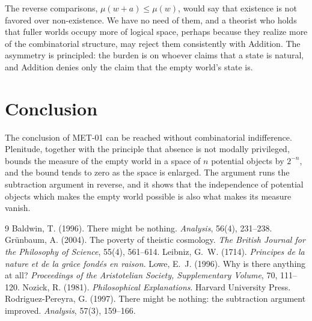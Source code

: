 \documentclass{situationist-preprint}
\begin{document}
\begin{reply}
The reverse comparisons, $\mu(w + a) \leq \mu(w)$, would say that existence is not favored over non-existence. We have no need of them, and a theorist who holds that fuller worlds occupy more of logical space, perhaps because they realize more of the combinatorial structure, may reject them consistently with Addition. The asymmetry is principled: the burden is on whoever claims that a state is natural, and Addition denies only the claim that the empty world's state is.
\end{reply}

\section{Conclusion}

The conclusion of MET-01 can be reached without combinatorial indifference. Plenitude, together with the principle that absence is not modally privileged, bounds the measure of the empty world in a space of $n$ potential objects by $2^{-n}$, and the bound tends to zero as the space is enlarged. The argument runs the subtraction argument in reverse, and it shows that the independence of potential objects which makes the empty world possible is also what makes its measure vanish.

\begin{thebibliography}{9}\small
{} Baldwin, T. (1996). There might be nothing. \emph{Analysis}, 56(4), 231--238.
 Grünbaum, A. (2004). The poverty of theistic cosmology. \emph{The British Journal for the Philosophy of Science}, 55(4), 561--614.
 Leibniz, G.~W. (1714). \emph{Principes de la nature et de la grâce fondés en raison}.
 Lowe, E.~J. (1996). Why is there anything at all? \emph{Proceedings of the Aristotelian Society, Supplementary Volume}, 70, 111--120.
 Nozick, R. (1981). \emph{Philosophical Explanations}. Harvard University Press.
 Rodriguez-Pereyra, G. (1997). There might be nothing: the subtraction argument improved. \emph{Analysis}, 57(3), 159--166.
\end{thebibliography}
\end{document}
